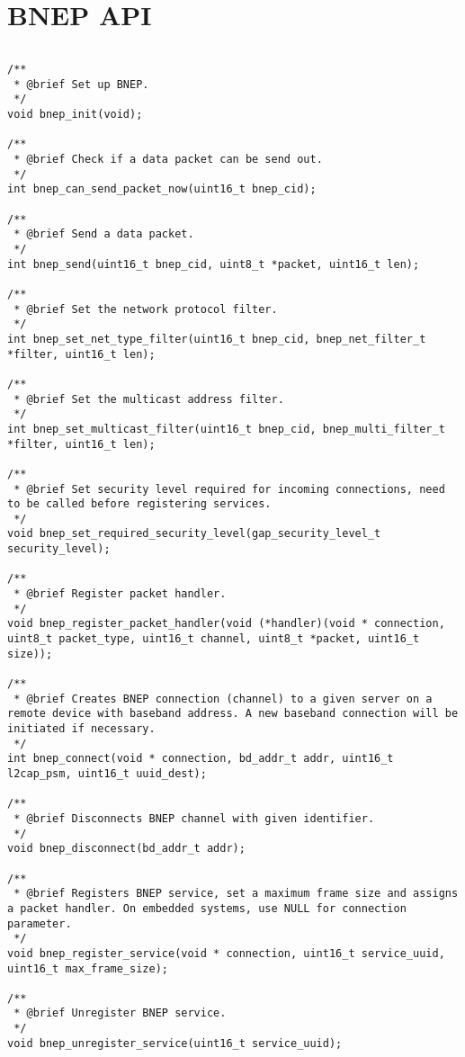 \section{BNEP API}
\label{appendix:api_bnep}
$ $
\begin{lstlisting}
/**
 * @brief Set up BNEP.
 */
void bnep_init(void);

/**
 * @brief Check if a data packet can be send out.
 */
int bnep_can_send_packet_now(uint16_t bnep_cid);

/**
 * @brief Send a data packet.
 */
int bnep_send(uint16_t bnep_cid, uint8_t *packet, uint16_t len);

/**
 * @brief Set the network protocol filter.
 */
int bnep_set_net_type_filter(uint16_t bnep_cid, bnep_net_filter_t *filter, uint16_t len);

/**
 * @brief Set the multicast address filter.
 */
int bnep_set_multicast_filter(uint16_t bnep_cid, bnep_multi_filter_t *filter, uint16_t len);

/**
 * @brief Set security level required for incoming connections, need to be called before registering services.
 */
void bnep_set_required_security_level(gap_security_level_t security_level);

/**
 * @brief Register packet handler. 
 */
void bnep_register_packet_handler(void (*handler)(void * connection, uint8_t packet_type, uint16_t channel, uint8_t *packet, uint16_t size));

/**
 * @brief Creates BNEP connection (channel) to a given server on a remote device with baseband address. A new baseband connection will be initiated if necessary. 
 */
int bnep_connect(void * connection, bd_addr_t addr, uint16_t l2cap_psm, uint16_t uuid_dest);

/**
 * @brief Disconnects BNEP channel with given identifier. 
 */
void bnep_disconnect(bd_addr_t addr);

/**
 * @brief Registers BNEP service, set a maximum frame size and assigns a packet handler. On embedded systems, use NULL for connection parameter. 
 */
void bnep_register_service(void * connection, uint16_t service_uuid, uint16_t max_frame_size);

/**
 * @brief Unregister BNEP service.
 */
void bnep_unregister_service(uint16_t service_uuid);
\end{lstlisting}
\pagebreak
